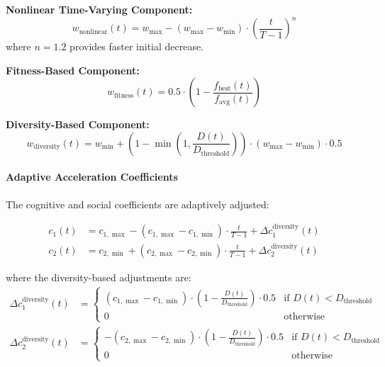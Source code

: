 \documentclass[12pt,a4paper]{article}
\begin{document}
\textbf{Nonlinear Time-Varying Component:}
\begin{equation}
w_{\text{nonlinear}}(t) = w_{\max} - (w_{\max} - w_{\min}) \cdot \left(\frac{t}{T-1}\right)^n \label{eq:nonlinear_inertia}
\end{equation}
where $n = 1.2$ provides faster initial decrease.

\textbf{Fitness-Based Component:}
\begin{equation}
w_{\text{fitness}}(t) = 0.5 \cdot \left(1 - \frac{f_{\text{best}}(t)}{f_{\text{avg}}(t)}\right) \label{eq:fitness_inertia}
\end{equation}

\textbf{Diversity-Based Component:}
\begin{equation}
w_{\text{diversity}}(t) = w_{\min} + (1 - \min(1, \frac{D(t)}{D_{\text{threshold}}})) \cdot (w_{\max} - w_{\min}) \cdot 0.5 \label{eq:diversity_inertia}
\end{equation}

\paragraph{Adaptive Acceleration Coefficients}
The cognitive and social coefficients are adaptively adjusted:

\begin{align}
c_1(t) &= c_{1,\max} - (c_{1,\max} - c_{1,\min}) \cdot \frac{t}{T-1} + \Delta c_1^{\text{diversity}}(t) \label{eq:adaptive_c1} \\
c_2(t) &= c_{2,\min} + (c_{2,\max} - c_{2,\min}) \cdot \frac{t}{T-1} + \Delta c_2^{\text{diversity}}(t) \label{eq:adaptive_c2}
\end{align}

where the diversity-based adjustments are:
\begin{align}
\Delta c_1^{\text{diversity}}(t) &= \begin{cases}
(c_{1,\max} - c_{1,\min}) \cdot (1 - \frac{D(t)}{D_{\text{threshold}}}) \cdot 0.5 & \text{if } D(t) < D_{\text{threshold}} \\
0 & \text{otherwise}
\end{cases} \label{eq:diversity_c1} \\
\Delta c_2^{\text{diversity}}(t) &= \begin{cases}
-(c_{2,\max} - c_{2,\min}) \cdot (1 - \frac{D(t)}{D_{\text{threshold}}}) \cdot 0.5 & \text{if } D(t) < D_{\text{threshold}} \\
0 & \text{otherwise}
\end{cases} \label{eq:diversity_c2}
\end{align}
\end{document}
